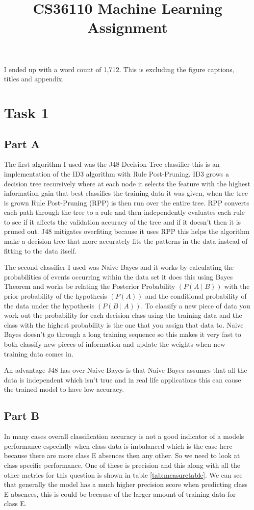 \documentclass[10pt]{article}
\title {CS36110 Machine Learning Assignment}
\date{}                                           %
\begin{document}
\maketitle

I ended up with a word count of 1,712. This is excluding the figure captions, titles and appendix.

\section*{Task 1}

\subsection*{Part A}
The first algorithm I used was the J48 Decision Tree classifier this is an implementation of the ID3 algorithm with Rule Post-Pruning. ID3 grows a decision tree recursively where at each node it selects the feature with the highest information gain that best classifies the training data it was given, when the tree is grown Rule Post-Pruning (RPP) is then run over the entire tree. RPP converts each path through the tree to a rule and then independently evaluates each rule to see if it affects the validation accuracy of the tree and if it doesn't then it is pruned out. J48 mitigates overfiting because it uses RPP this helps the algorithm make a decision tree that more accurately fits the patterns in the data instead of fitting to the data itself.

The second classifier I used was Naive Bayes and it works by calculating the probabilities of events occurring within the data set it does this using Bayes Theorem and works be relating the Posterior Probability $(P(A \mid B))$ with the prior probability of the hypothesis $(P(A))$ and the conditional probability of the data under the hypothesis $(P(B \mid A))$. To classify a new piece of data you work out the probability for each decision class using the training data and the class with the highest probability is the one that you assign that data to. Naive Bayes doesn't go through a long training sequence so this makes it very fast to both classify new pieces of information and update the weights when new training data comes in.

An advantage J48 has over Naive Bayes is that Naive Bayes assumes that all the data is independent which isn't true and in real life applications this can cause the trained model to have low accuracy.

\subsection*{Part B}
In many cases overall classification accuracy is not a good indicator of a models performance especially when class data is imbalanced which is the case here because there are more class E absences then any other. So we need to look at class specific performance. One of these is precision and this along with all the other metrics for this question is shown in table \ref{tab:measuretable}. We can see that generally the model has a much higher precision score when predicting class E absences, this is could be because of the larger amount of training data for class E.
\end{document}
